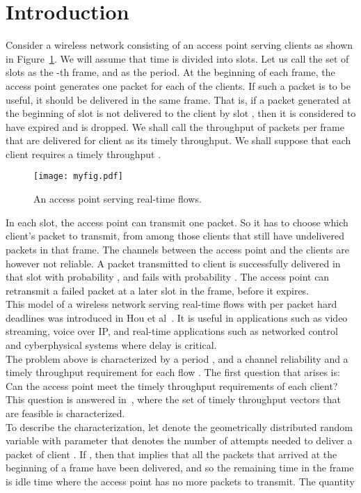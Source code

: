 \documentclass[letterpaper, 10 pt, conference]{ieeeconf}
\begin{document}
\section{Introduction}\label{sec1}
Consider a wireless network consisting of an access point serving  clients as shown in Figure~\ref{fig1}. We will assume that time is divided into slots. Let us call the set of slots  as the -th frame, and  as the period. At the beginning of each frame, the access point generates one packet for each of the  clients. If such a packet is to be useful, it should be
delivered in the same frame. That is, if a packet generated at the beginning of slot  is not delivered to the client by slot , then it is considered to have expired and is dropped. 
We shall call the throughput of packets per frame that are delivered for client  as its timely throughput. We shall suppose that each client  requires a timely throughput .
\begin{figure}[b]
\texttt{[image: myfig.pdf]}
\caption{An access point serving  real-time flows.}
\label{fig1}
\end{figure}
In each slot, the access point can transmit one packet. So it has to choose which client's packet to transmit, from among those clients that still have undelivered packets in that frame. The channels between the access point and the clients are however not reliable. A packet transmitted to client  is successfully delivered in that slot with probability , and fails with probability . The access point can retransmit a failed packet at a later slot in the frame, before it expires.\\
This model of a wireless network serving real-time flows with per packet hard deadlines was introduced in Hou et al~\cite{c3}. It is useful in applications such as video streaming, voice over IP, and  real-time applications such as networked control and cyberphysical systems where delay is critical.\\
The problem above is characterized by a period , and a channel reliability  and a timely throughput requirement  for each flow . The first question that arises is: Can the access point meet the timely throughput requirements of each client? This question is answered in~\cite{c3}, where the set of timely throughput vectors  that are feasible is characterized.\\
To describe the characterization, let  denote the geometrically distributed random variable with parameter  that denotes the number of attempts needed to deliver a packet of client . If , then that implies that all the packets that arrived at the beginning of a frame have been delivered, and so the remaining time in the frame  is idle time where the access point has no more packets to transmit. The quantity 
 
\end{document}
